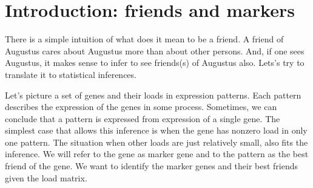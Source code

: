 \documentclass{llncs}
\begin{document}
\begin{abstract}

\textcolor{green}{We define a tag's most friendly cloud as a cloud that pays maximal rank-normalized attention to the tag.}
Suppose we have a set of {\tag}s and a set of fuzzy set of {\tag}s, which we will refer to as {\cloud}s, and a we have the {\tag}-to-{\cloud} relation quantified as a scalar for each $\left( {\tag},{\cloud}\right)$ pair. An example is: {\tag}s are genes, {\cloud}s are gene expression patterns, and the scalars are loads of the genes in the patterns. Sometimes, observation that a gene is expressed implies expression of a particular pattern (the simplest case is: the gene has nonzero load only in that pattern). If so, we say that the gene marks the pattern. Here we describe a statistical test that identify pairs of a marker {\tag} and the marked {\cloud}. The test is based on rank statistics and it does not rely on propositions about the distribution of the relation quantity. The marked {\cloud} is referred to as the {\tag}'s best friend, and the test is named "the best friends test" or "the gene's best friends test". The statistics is naturally expand to the case when a {\tag} selects (separates) a subset of {\cloud}s, thus having more than one best friend. The code (currently, only R) is available at \url{https://github.com/favorov/best-friends}
\end{abstract}
%


\section{Introduction: friends and markers}

There is a simple intuition of what does it mean to be a friend. A friend of Augustus cares about Augustus more than about other persons. And, if one sees Augustus, it makes sense to infer to see friends(s) of Augustus also. Lets’s try to translate it to statistical inferences.

Let's picture a set of genes and their loads in expression patterns. Each pattern describes the expression of the genes in some process. Sometimes, we can conclude that a pattern is expressed from expression of a single gene. The simplest case that allows this inference is when the gene has nonzero load in only one pattern. The situation when other loads are just relatively small, also fits the inference. We will refer to the gene as marker gene and to the pattern as the best friend of the gene. We want to identify the marker genes and their best friends given the load matrix.
\end{document}
